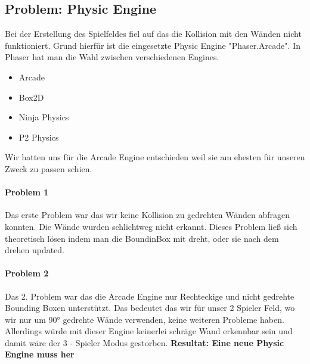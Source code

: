 \subsection{Problem: Physic Engine} 
Bei der Erstellung des Spielfeldes fiel auf das die Kollision mit den Wänden nicht funktioniert. Grund hierfür ist die eingesetzte Physic Engine "Phaser.Arcade".
In Phaser hat man die Wahl zwischen verschiedenen Engines.
\begin{itemize}
\item
Arcade
\item
Box2D
\item
Ninja Physics
\item
P2 Physics
\end{itemize}
Wir hatten uns für die Arcade Engine entschieden weil sie am ehesten für unseren Zweck zu passen schien.
\paragraph{Problem 1}
Das erste Problem war das wir keine Kollision zu gedrehten Wänden abfragen konnten. Die Wände wurden schlichtweg nicht erkannt.
Dieses Problem ließ sich theoretisch lösen indem man die BoundinBox mit dreht, oder sie nach dem drehen updated.
\paragraph{Problem 2}
Das 2. Problem war das die Arcade Engine nur Rechteckige und nicht gedrehte Bounding Boxen unterstützt. Das bedeutet das wir für unser 2 Spieler Feld, wo wir nur um 90° gedrehte Wände verwenden, keine weiteren Probleme haben. Allerdings würde mit dieser Engine keinerlei schräge Wand erkennbar sein und damit wäre der 3 - Spieler Modus gestorben.
\newline
\textbf{Resultat: Eine neue Physic Engine muss her}

